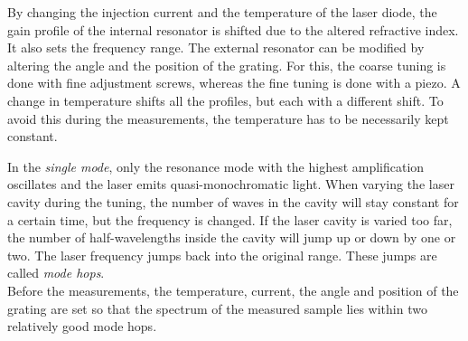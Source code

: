 By changing the injection current and the temperature of the laser diode, the gain profile of the internal resonator is shifted due to the altered refractive index. It also sets the frequency range. The external resonator can be modified by altering the angle and the position of the grating. For this, the coarse tuning is done with fine adjustment screws, whereas the fine tuning is done with a piezo. A change in temperature shifts all the profiles, but each with a different shift. To avoid this during the measurements, the temperature has to be necessarily kept constant.

In the \emph{single mode}, only the resonance mode with the highest amplification oscillates and the laser emits quasi-monochromatic light.
When varying the laser cavity during the tuning, the number of waves in the cavity will stay constant for a certain time, but the frequency is changed. If the laser cavity is varied too far, the number of half-wavelengths inside the cavity will jump up or down by one or two. The laser frequency jumps back into the original range. These jumps are called \emph{mode hops}.\\
Before the measurements, the temperature, current, the angle and position of the grating are set so that the spectrum of the measured sample lies within two relatively good mode hops.

